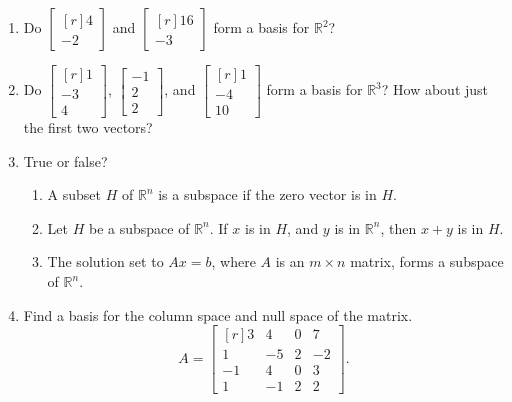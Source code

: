 \documentclass[12pt]{article}
\begin{document}
\begin{multicols*}{2}
\begin{enumerate}
		\vfill

		\item Do $\begin{bmatrix*}[r]
			4\\-2
		\end{bmatrix*}$ and $\begin{bmatrix*}[r]
			16\\-3
		\end{bmatrix*}$  form a basis for $\mathbb{R}^2$?

		\vfill

		\item Do $\begin{bmatrix*}[r]
			1\\-3\\4
		\end{bmatrix*}$, $\begin{bmatrix*}
			-1\\2\\2
		\end{bmatrix*}$, and $\begin{bmatrix*}[r]
			1\\-4\\10
		\end{bmatrix*}$ form a basis for $\mathbb{R}^3$? How about just the first two vectors?

		\vfill\null\columnbreak

		\item True or false?
		\begin{enumerate}
			\item A subset $H$ of $\mathbb{R}^n$ is a subspace if the zero vector is in $H$.
			\vfill
			\item Let $H$ be a subspace of $\mathbb{R}^n$. If $x$ is in $H$, and $y$ is in $\mathbb{R}^n$, then $x+y$ is in $H$.
			\vfill
			\item The solution set to $Ax=b$, where $A$ is an $m\times n$ matrix, forms a subspace of $\mathbb{R}^n$.
		\end{enumerate}
		\vfill

		\item Find a basis for the column space and null space of the matrix.
		\[
		A = \begin{bmatrix*}[r]
			3 & 4 & 0 & 7\\
			1 & -5 & 2 & -2\\
			-1 & 4 & 0 & 3\\
			1 & -1 & 2 & 2
		\end{bmatrix*}.
		\]


\end{enumerate}
\end{multicols*}
\end{document}

